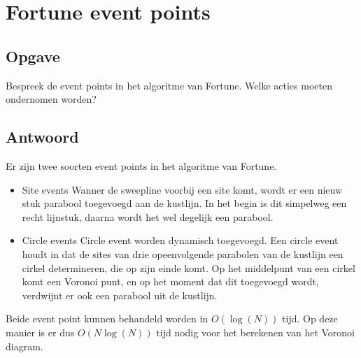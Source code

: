 \documentclass[examenvragen.tex]{subfiles}
\begin{document}
\section{Fortune event points}
\subsection{Opgave}
Bespreek de event points in het algoritme van Fortune.
Welke acties moeten ondernomen worden?

\subsection{Antwoord}
Er zijn twee soorten event points in het algoritme van Fortune.
\begin{itemize}
\item Site events
Wanner de sweepline voorbij een site komt, wordt er een nieuw stuk parabool toegevoegd aan de kustlijn. In het begin is dit simpelweg een recht lijnstuk, daarna wordt het wel degelijk een parabool.

\item Circle events
Circle event worden dynamisch toegevoegd. Een circle event houdt in dat de sites van drie opeenvolgende parabolen van de kustlijn een cirkel determineren, die op zijn einde komt. Op het middelpunt van een cirkel komt een Voronoi punt, en op het moment dat dit toegevoegd wordt, verdwijnt er ook een parabool uit de kustlijn. 
\end{itemize}
Beide event point kunnen behandeld worden in $O(\log(N))$ tijd. Op deze manier is er dus $O(N\log(N))$ tijd nodig voor het berekenen van het Voronoi diagram.
\end{document}
